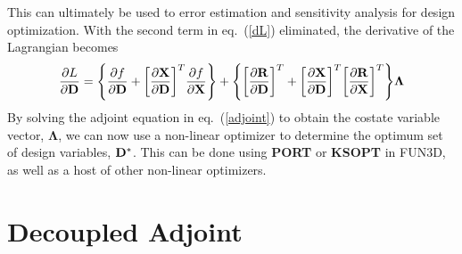 \documentclass{article}   	%
\begin{document}
This can ultimately be used to error estimation and sensitivity analysis for
design optimization.  With the second term in eq.~(\ref{dL}) eliminated, the
derivative of the Lagrangian becomes
\begin{equation}
  \frac{\partial L}{\partial {\mathbf D}}=
  \Bigg\{\frac{\partial f}{\partial {\mathbf D}}+\bigg[\frac{\partial {\mathbf X}}{\partial
  {\mathbf D}}\bigg]^T \frac{\partial f}{\partial {\mathbf X}}\Bigg\}
  +\Bigg\{\bigg[\frac{\partial {\mathbf R}}{\partial {\mathbf D}}\bigg]^T
  +\bigg[\frac{\partial {\mathbf X}}{\partial {\mathbf D}}\bigg]^T\bigg[\frac{\partial
  {\mathbf R}}{\partial {\mathbf X}}\bigg]^T\Bigg\}\mathbf{\Lambda}
  \label{obj_function}
\end{equation}
By solving the adjoint equation in eq.~(\ref{adjoint}) to obtain the costate
variable vector, $\mathbf{\Lambda}$, we can now use a non-linear optimizer to
determine the optimum set of design variables, ${\mathbf D}^*$. This can be done using
{\bf PORT} or {\bf KSOPT} in FUN3D, as well as a host of other non-linear
optimizers.

\section{Decoupled Adjoint}
\end{document}
